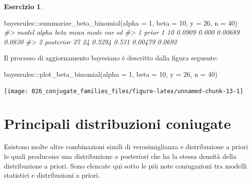 \documentclass[
  10pt,
  italian,
  a4paper,
  extrafontsizes,onecolumn,openright
  ]{memoir}
\newenvironment{Shaded}{\begin{snugshade}}{\end{snugshade}}
\newcommand{\AttributeTok}[1]{\textcolor[rgb]{0.77,0.63,0.00}{#1}}
\newcommand{\CommentTok}[1]{\textcolor[rgb]{0.56,0.35,0.01}{\textit{#1}}}
\newcommand{\DecValTok}[1]{\textcolor[rgb]{0.00,0.00,0.81}{#1}}
\newcommand{\FunctionTok}[1]{\textcolor[rgb]{0.00,0.00,0.00}{#1}}
\newcommand{\NormalTok}[1]{#1}
\newcommand{\SpecialCharTok}[1]{\textcolor[rgb]{0.00,0.00,0.00}{#1}}
\theoremstyle{definition}
\theoremstyle{definition}
\theoremstyle{definition}
\newtheorem{exercise}{Esercizio}[chapter]
\theoremstyle{definition}
\theoremstyle{remark}
\begin{document}
\begin{exercise}
\begin{Shaded}
\begin{Highlighting}[]
\NormalTok{bayesrules}\SpecialCharTok{:::}\FunctionTok{summarize\_beta\_binomial}\NormalTok{(}\AttributeTok{alpha =} \DecValTok{1}\NormalTok{, }\AttributeTok{beta =} \DecValTok{10}\NormalTok{, }\AttributeTok{y =} \DecValTok{26}\NormalTok{, }\AttributeTok{n =} \DecValTok{40}\NormalTok{)}
\CommentTok{\#\textgreater{}       model alpha beta   mean  mode     var     sd}
\CommentTok{\#\textgreater{} 1     prior     1   10 0.0909 0.000 0.00689 0.0830}
\CommentTok{\#\textgreater{} 2 posterior    27   24 0.5294 0.531 0.00479 0.0692}
\end{Highlighting}
\end{Shaded}

\noindent
Il processo di aggiornamento bayesiano è descritto dalla figura seguente:

\begin{Shaded}
\begin{Highlighting}[]
\NormalTok{bayesrules}\SpecialCharTok{:::}\FunctionTok{plot\_beta\_binomial}\NormalTok{(}\AttributeTok{alpha =} \DecValTok{1}\NormalTok{, }\AttributeTok{beta =} \DecValTok{10}\NormalTok{, }\AttributeTok{y =} \DecValTok{26}\NormalTok{, }\AttributeTok{n =} \DecValTok{40}\NormalTok{) }
\end{Highlighting}
\end{Shaded}

\begin{center}\texttt{[image: 026\_conjugate\_families\_files/figure-latex/unnamed-chunk-13-1]} \end{center}

\end{exercise}

\hypertarget{principali-distribuzioni-coniugate}{%
\section{Principali distribuzioni coniugate}\label{principali-distribuzioni-coniugate}}

Esistono molte altre combinazioni simili di verosimiglianza e distribuzione a priori le quali producono una distribuzione a posteriori che ha la stessa densità della distribuzione a priori. Sono elencate qui sotto le più note coniugazioni tra modelli statistici e distribuzioni a priori.
\end{document}
